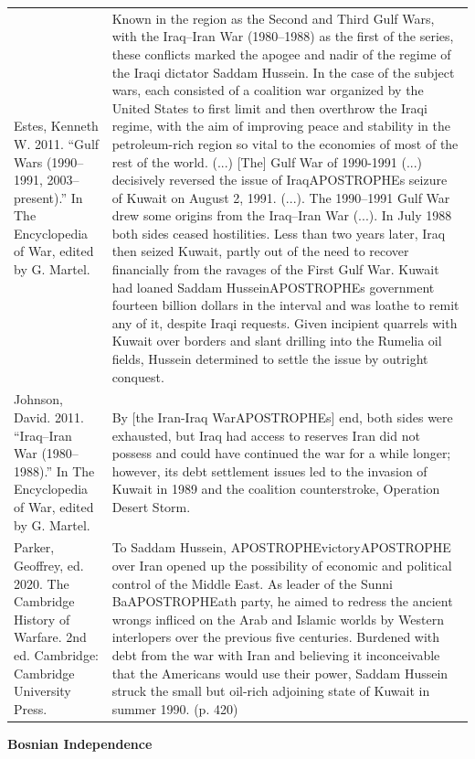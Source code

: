 {\begin{longtable}{p{}p{}}
\\
Estes, Kenneth W. 2011. “Gulf Wars (1990–1991, 2003–present).” In The Encyclopedia of War, edited by G. Martel. & Known in the region as the Second and Third Gulf Wars, with the Iraq–Iran War (1980–1988) as the first of the series, these conflicts marked the apogee and nadir of the regime of the Iraqi dictator Saddam Hussein. In the case of the subject wars, each consisted of a coalition war organized by the United States to first limit and then overthrow the Iraqi regime, with the aim of improving peace and stability in the petroleum-rich region so vital to the economies of most of the rest of the world. (...) [The] Gulf War of 1990-1991 (...) decisively reversed the issue of IraqAPOSTROPHEs seizure of Kuwait on August 2, 1991. (...). The 1990–1991 Gulf War drew some origins from the Iraq–Iran War (...). In July 1988 both sides ceased hostilities. Less than two years later, Iraq then seized Kuwait, partly out of the need to recover financially from the ravages of the First Gulf War. Kuwait had loaned Saddam HusseinAPOSTROPHEs government fourteen billion dollars in the interval and was loathe to remit any of it, despite Iraqi requests. Given incipient quarrels with Kuwait over borders and slant drilling into the Rumelia oil fields, Hussein determined to settle the issue by outright conquest.
\\
Johnson, David. 2011. “Iraq–Iran War (1980–1988).” In The Encyclopedia of War, edited by G. Martel. & By [the Iran-Iraq WarAPOSTROPHEs] end, both sides were exhausted, but Iraq had access to reserves Iran did not possess and could have continued the war for a while longer; however, its debt settlement issues led to the invasion of Kuwait in 1989 and the coalition counterstroke, Operation Desert Storm.
\\
Parker, Geoffrey, ed. 2020. The Cambridge History of Warfare. 2nd ed. Cambridge: Cambridge University Press. & To Saddam Hussein, APOSTROPHEvictoryAPOSTROPHE over Iran opened up the possibility of economic and political control of the Middle East. As leader of the Sunni BaAPOSTROPHEath party, he aimed to redress the ancient wrongs infliced on the Arab and Islamic worlds by Western interlopers over the previous five centuries. Burdened with debt from the war with Iran and believing it inconceivable that the Americans would use their power, Saddam Hussein struck the small but oil-rich adjoining state of Kuwait in summer 1990. (p. 420)
\\
\end{longtable}}
\clearpage
         \textbf{Bosnian Independence} 

